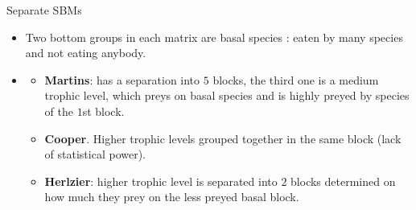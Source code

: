 \documentclass[compress,10pt]{beamer}
\begin{document}
\begin{frame}{Separate  SBMs}
   
   
   
 \begin{itemize}
  \item Two bottom groups in each matrix are basal species : 
  eaten by many species and not eating anybody. 
  \item 
  \begin{itemize}
  \item \textbf{Martins}:  has a separation into $5$ blocks, the third one is a medium trophic level, which preys on basal species and is highly preyed by species of the $1$st block.
 \item 
  \textbf{Cooper}. Higher trophic levels grouped together in the same block (lack of statistical power). 
  \item \textbf{Herlzier}:  higher trophic level is separated into $2$ blocks determined on how much they prey on the less preyed basal block. 
  
\end{itemize}
\end{itemize}
   
\end{frame}






 
\end{document}
